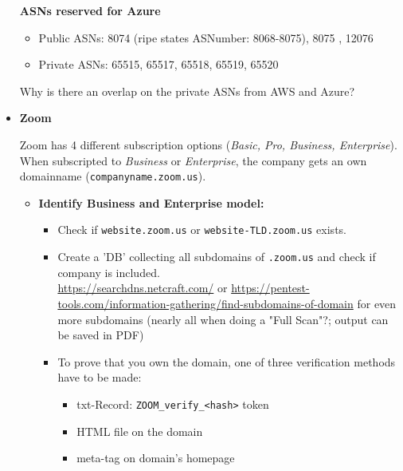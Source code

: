 \documentclass[12pt]{article}
\begin{document}
\begin{itemize}
\begin{itemize}
    \end{itemize}
    
    \textbf{ASNs reserved for Azure}
    \begin{itemize}
        \item Public ASNs: 8074 (ripe states ASNumber: 8068-8075), 8075 , 12076
        \item Private ASNs: 65515, 65517, 65518, 65519, 65520
    \end{itemize}
    
    Why is there an overlap on the private ASNs from AWS and Azure?
    
    
    
    \item \textbf{Zoom}
    
    Zoom has 4 different subscription options (\textit{Basic, Pro, Business, Enterprise}). When subscripted to \textit{Business} or \textit{Enterprise}, the company gets an own domainname (\verb|companyname.zoom.us|).
    
    \begin{itemize}
        \item \textbf{Identify Business and Enterprise model:} 
        \begin{itemize}
            \item Check if \verb|website.zoom.us| or \verb|website-TLD.zoom.us| exists.
            \item Create a 'DB' collecting all subdomains of \verb|.zoom.us| and check if company is included.\\
            \url{https://searchdns.netcraft.com/} or \url{https://pentest-tools.com/information-gathering/find-subdomains-of-domain} for even more subdomains (nearly all when doing a "Full Scan"?; output can be saved in PDF)
            \item To prove that you own the domain, one of three verification methods have to be made:
            \begin{itemize}
                \item txt-Record: \verb|ZOOM_verify_<hash>| token
                \item HTML file on the domain
                \item meta-tag on domain's homepage
            \end{itemize}
        \end{itemize}
    \end{itemize}
    

\end{itemize}
\end{document}
